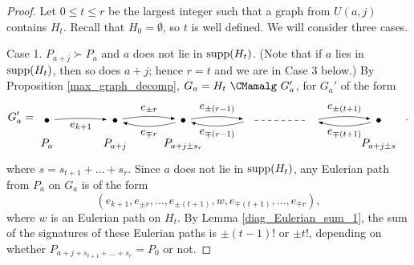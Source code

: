 \documentclass{amsproc}
\theoremstyle{definition}
\theoremstyle{remark}
\numberwithin{equation}{section}
\newcommand{\nodeDist}{2}
\newcommand{\supp}{{\rm supp}}
\begin{document}
\begin{proof} Let $0 \leqslant t \leqslant r$ be the largest integer such that a graph from $U(a, j)$ 
contains $H_t$. Recall that $H_0 = \emptyset$, so $t$ is well defined. We will consider three cases.

\smallskip
Case 1. $P_{a+j}\succ P_{a}$ and $a$ does not lie in $\supp(H_t)$.  (Note that if $a$ lies in $\supp(H_t)$, then so does $a + j$;
hence $r = t$ and we are in Case 3 below.)
By Proposition \ref{max_graph_decomp}, $G_a=H_t\ \CMamalg\ G_a'$, for $G_a'$ of the form
\renewcommand{\nodeDist}{2}
\[G_a'=
\begin{tikzpicture}[baseline,vertex/.style={anchor=base, circle, fill,minimum size=4pt, inner sep=0pt, outer sep=0pt},auto,
                               edge/.style={->,>=latex, shorten > = 5pt,shorten < = 5pt},
position/.style args={#1:#2 from #3}{
    at=(#3.#1), anchor=#1+180, shift=(#1:#2)
}]
  \node[vertex] (v1) {};
  \node[vertex,position = 0:{\nodeDist} from v1] (v2) {};
  \node[vertex,position = 0:{\nodeDist} from v2] (v3) {};
  \coordinate[position = 0:{\nodeDist} from v3] (v4);
  \coordinate[position = 0:{\nodeDist} from v4] (v5) {};
  \node[vertex,position = 0:{\nodeDist} from v5] (v6) {};

  \draw (v1) node[below = 13] {$P_a$};
  \draw (v2) node[below = 13] {$P_{a+j}$};
  \draw (v3) node[below = 13] {$P_{a+j\pm s_{r}}$};
  \draw (v6) node[below = 13] {$P_{a+j\pm s}$};

  \draw[edge] (v1) to [bend left=5] node[below] {$e_{k+1}$} (v2);

  \draw[edge] (v2) to [bend left=10] node[above] {$e_{\pm r}$} (v3);
  \draw[edge] (v3) to [bend left=15] node[below] {$e_{\mp r}$} (v2);

  \draw[edge] (v3) to [bend left=10] node[above] {$e_{\pm (r-1)}$} (v4);
  \draw[edge] (v4) to [bend left=15] node[below] {$e_{\mp (r-1)}$} (v3);

  \draw[dashed,shorten > = 5pt, shorten < = 5pt] (v4) -- (v5);

  \draw[edge] (v5) to [bend left=10] node[above] {$e_{\pm (t+1)}$} (v6);
  \draw[edge] (v6) to [bend left=15] node[below] {$e_{\mp (t+1)}$} (v5);
\end{tikzpicture}\enskip .
\]
where $s=s_{t+1}+\dots+s_r$.
Since $a$ does not lie in $\supp(H_t)$, any Eulerian path from $P_a$ on $G_a$ is of the form 
\[(e_{k+1},e_{\pm r},\dots,e_{\pm (t + 1)},w,e_{\mp (t+1)},\dots,e_{\mp r}), \] 
where $w$ is an Eulerian path on $H_t$. 
By Lemma \ref{diag_Eulerian_sum_1}, the sum of the signatures of these Eulerian paths is $\pm(t-1)!$ or $\pm t!$, depending on
whether $P_{a+j+s_{t+1}+\dots+s_{r}} = P_{0}$ or not.


\end{proof}
\end{document}
